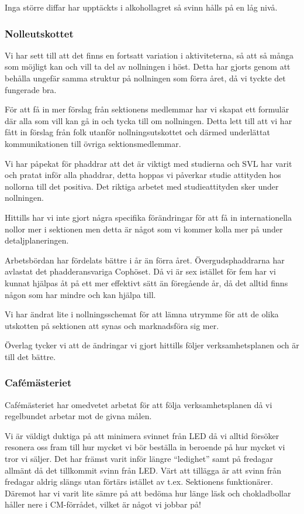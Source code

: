 \documentclass[../_main/handlingar.tex]{subfiles}
\begin{document}
Inga större diffar har upptäckts i alkohollagret så svinn hålls på en låg nivå.

\subsubsection*{Nolleutskottet}
Vi har sett till att det finns en fortsatt variation i aktiviteterna, så att så många som möjligt kan och vill ta del av nollningen i höst. Detta har gjorts genom att behålla ungefär samma struktur på nollningen som förra året, då vi tyckte det fungerade bra.

För att få in mer förslag från sektionens medlemmar har vi skapat ett formulär där alla som vill kan gå in och tycka till om nollningen. Detta lett till att vi har fått in förslag från folk utanför nollningsutskottet och därmed underlättat kommunikationen till övriga sektionsmedlemmar.

Vi har påpekat för phaddrar att det är viktigt med studierna och SVL har varit och pratat inför alla phaddrar, detta hoppas vi påverkar studie attityden hos nollorna till det positiva. Det riktiga arbetet med studieattityden sker under nollningen.

Hittills har vi inte gjort några specifika förändringar för att få in internationella nollor mer i sektionen men detta är något som vi kommer kolla mer på under detaljplaneringen.

Arbetsbördan har fördelats bättre i år än förra året. Övergudsphaddrarna har avlastat det phadderansvariga Cophöset. Då vi är sex istället för fem har vi kunnat hjälpas åt på ett mer effektivt sätt än föregående år, då det alltid finns någon som har mindre och kan hjälpa till.

Vi har ändrat lite i nollningsschemat för att lämna utrymme för att de olika utskotten på sektionen att synas och marknadsföra sig mer.

Överlag tycker vi att de ändringar vi gjort hittills följer verksamhetsplanen och är till det bättre.

\subsubsection*{Cafémästeriet}
Cafémästeriet har omedvetet arbetat för att följa verksamhetsplanen då vi regelbundet arbetar mot de givna målen.

Vi är väldigt duktiga på att minimera svinnet från LED då vi alltid försöker resonera oss fram till hur mycket vi bör beställa in beroende på hur mycket vi tror vi säljer. Det har främst varit inför längre “ledighet” samt på fredagar allmänt då det tillkommit svinn från LED. Värt att tillägga är att svinn från fredagar aldrig slängs utan förtärs istället av t.ex. Sektionens funktionärer. Däremot har vi varit lite sämre på att bedöma hur länge läsk och chokladbollar håller nere i CM-förrådet, vilket är något vi jobbar på!
\end{document}

